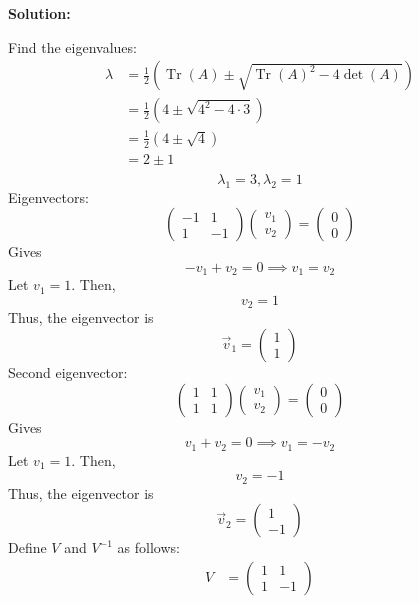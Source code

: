 \documentclass[12pt]{article}
\DeclareMathOperator{\Tr}{Tr}
\newenvironment{solution}{
    \textbf{Solution:}
    
}{
    
    \vspace{2em}
}
\begin{document}
\begin{solution}
    Find the eigenvalues:
    \[
        \begin{aligned}
            \lambda &= \frac{1}{2}(\Tr(A) \pm \sqrt{\Tr(A)^2 - 4\det(A)}) \\
            &= \frac{1}{2}(4 \pm \sqrt{4^2 - 4 \cdot 3})\\
            &= \frac{1}{2}(4 \pm \sqrt{4})\\
            &= 2 \pm 1\\
        \end{aligned}
    \]
    \[
        \lambda_1 = 3, \lambda_2 = 1
    \]
    Eigenvectors:
    \[
        \begin{pmatrix} -1 & 1 \\ 1 & -1 \end{pmatrix} \begin{pmatrix} v_1 \\ v_2 \end{pmatrix} = \begin{pmatrix} 0 \\ 0 \end{pmatrix}
    \]
    Gives
    \[
        -v_1 + v_2 = 0 \implies v_1 = v_2
    \]
    Let \(v_1 = 1\). Then,
    \[
        v_2 = 1
    \]
    Thus, the eigenvector is
    \[
        \vec{v}_1 = \begin{pmatrix} 1 \\ 1 \end{pmatrix}
    \]
    Second eigenvector:
    \[
        \begin{pmatrix} 1 & 1 \\ 1 & 1 \end{pmatrix} \begin{pmatrix} v_1 \\ v_2 \end{pmatrix} = \begin{pmatrix} 0 \\ 0 \end{pmatrix}
    \]
    Gives
    \[
        v_1 + v_2 = 0 \implies v_1 = -v_2
    \]
    Let \(v_1 = 1\). Then,
    \[
        v_2 = -1
    \]
    Thus, the eigenvector is
    \[
        \vec{v}_2 = \begin{pmatrix} 1 \\ -1 \end{pmatrix}
    \]
    Define \(V\) and \(V^{-1}\) as follows:
    \[
        \begin{aligned}
            V &= \begin{pmatrix} 1 & 1 \\ 1 & -1 \end{pmatrix} \\

\end{aligned}\]
\end{solution}
\end{document}
